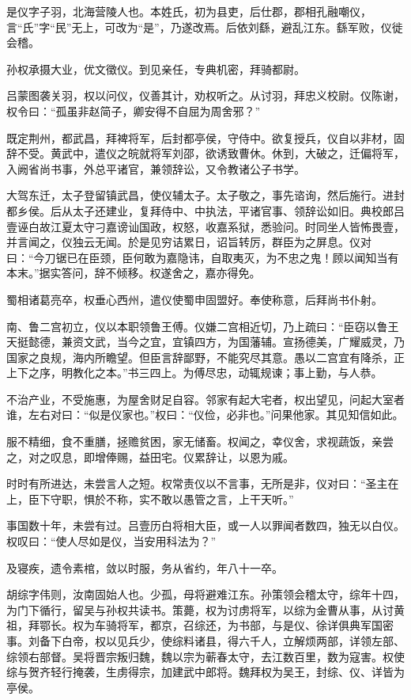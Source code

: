 \documentclass[12pt,UTF8]{ctexbook}
\begin{document}
是仪字子羽，北海营陵人也。本姓氏，初为县吏，后仕郡，郡相孔融嘲仪，言“氏”字“民”无上，可改为“是”，乃遂改焉。后依刘繇，避乱江东。繇军败，仪徙会稽。

孙权承摄大业，优文徵仪。到见亲任，专典机密，拜骑都尉。

吕蒙图袭关羽，权以问仪，仪善其计，劝权听之。从讨羽，拜忠义校尉。仪陈谢，权令曰：“孤虽非赵简子，卿安得不自屈为周舍邪？”

既定荆州，都武昌，拜裨将军，后封都亭侯，守侍中。欲复授兵，仪自以非材，固辞不受。黄武中，遣仪之皖就将军刘邵，欲诱致曹休。休到，大破之，迁偏将军，入阙省尚书事，外总平诸官，兼领辞讼，又令教诸公子书学。

大驾东迁，太子登留镇武昌，使仪辅太子。太子敬之，事先谘询，然后施行。进封都乡侯。后从太子还建业，复拜侍中、中执法，平诸官事、领辞讼如旧。典校郎吕壹诬白故江夏太守刁嘉谤讪国政，权怒，收嘉系狱，悉验问。时同坐人皆怖畏壹，并言闻之，仪独云无闻。於是见穷诘累日，诏旨转厉，群臣为之屏息。仪对曰：“今刀锯已在臣颈，臣何敢为嘉隐讳，自取夷灭，为不忠之鬼！顾以闻知当有本末。”据实答问，辞不倾移。权遂舍之，嘉亦得免。

蜀相诸葛亮卒，权垂心西州，遣仪使蜀申固盟好。奉使称意，后拜尚书仆射。

南、鲁二宫初立，仪以本职领鲁王傅。仪嫌二宫相近切，乃上疏曰：“臣窃以鲁王天挺懿德，兼资文武，当今之宜，宜镇四方，为国藩辅。宣扬德美，广耀威灵，乃国家之良规，海内所瞻望。但臣言辞鄙野，不能究尽其意。愚以二宫宜有降杀，正上下之序，明教化之本。”书三四上。为傅尽忠，动辄规谏；事上勤，与人恭。

不治产业，不受施惠，为屋舍财足自容。邻家有起大宅者，权出望见，问起大室者谁，左右对曰：“似是仪家也。”权曰：“仪俭，必非也。”问果他家。其见知信如此。

服不精细，食不重膳，拯赡贫困，家无储畜。权闻之，幸仪舍，求视蔬饭，亲尝之，对之叹息，即增俸赐，益田宅。仪累辞让，以恩为戚。

时时有所进达，未尝言人之短。权常责仪以不言事，无所是非，仪对曰：“圣主在上，臣下守职，惧於不称，实不敢以愚管之言，上干天听。”

事国数十年，未尝有过。吕壹历白将相大臣，或一人以罪闻者数四，独无以白仪。权叹曰：“使人尽如是仪，当安用科法为？”

及寝疾，遗令素棺，敛以时服，务从省约，年八十一卒。

胡综字伟则，汝南固始人也。少孤，母将避难江东。孙策领会稽太守，综年十四，为门下循行，留吴与孙权共读书。策薨，权为讨虏将军，以综为金曹从事，从讨黄祖，拜鄂长。权为车骑将军，都京，召综还，为书部，与是仪、徐详俱典军国密事。刘备下白帝，权以见兵少，使综料诸县，得六千人，立解烦两部，详领左部、综领右部督。吴将晋宗叛归魏，魏以宗为蕲春太守，去江数百里，数为寇害。权使综与贺齐轻行掩袭，生虏得宗，加建武中郎将。魏拜权为吴王，封综、仪、详皆为亭侯。
\end{document}
